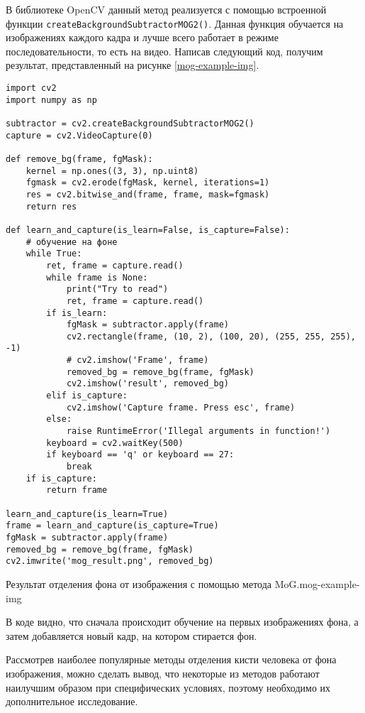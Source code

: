 В библиотеке OpenCV данный метод реализуется с помощью встроенной функции
{\tt createBackgroundSubtractorMOG2()}. Данная функция обучается на изображениях
каждого кадра и лучше всего работает в режиме последовательности, то есть на
видео. Написав следующий код, получим результат, представленный на рисунке
\ref{mog-example-img}.

\begin{verbatim}
import cv2
import numpy as np

subtractor = cv2.createBackgroundSubtractorMOG2()
capture = cv2.VideoCapture(0)

def remove_bg(frame, fgMask):
    kernel = np.ones((3, 3), np.uint8)
    fgmask = cv2.erode(fgMask, kernel, iterations=1)
    res = cv2.bitwise_and(frame, frame, mask=fgmask)
    return res

def learn_and_capture(is_learn=False, is_capture=False):
    # обучение на фоне
    while True:
        ret, frame = capture.read()
        while frame is None:
            print("Try to read")
            ret, frame = capture.read()
        if is_learn:
            fgMask = subtractor.apply(frame)
            cv2.rectangle(frame, (10, 2), (100, 20), (255, 255, 255), -1)
            # cv2.imshow('Frame', frame)
            removed_bg = remove_bg(frame, fgMask)
            cv2.imshow('result', removed_bg)
        elif is_capture:
            cv2.imshow('Capture frame. Press esc', frame)
        else:
            raise RuntimeError('Illegal arguments in function!')
        keyboard = cv2.waitKey(500)
        if keyboard == 'q' or keyboard == 27:
            break
    if is_capture:
        return frame

learn_and_capture(is_learn=True)
frame = learn_and_capture(is_capture=True)
fgMask = subtractor.apply(frame)
removed_bg = remove_bg(frame, fgMask)
cv2.imwrite('mog_result.png', removed_bg)
\end{verbatim}

{Результат отделения фона от изображения с помощью метода MoG.}{mog-example-img}

В коде видно, что сначала происходит обучение на первых изображениях фона, 
а затем добавляется новый кадр, на котором стирается фон.

\bigskip

Рассмотрев наиболее популярные методы отделения кисти человека от фона изображения, можно сделать
вывод, что некоторые из методов работают наилучшим образом при специфических условиях, поэтому
необходимо их дополнительное исследование. 









